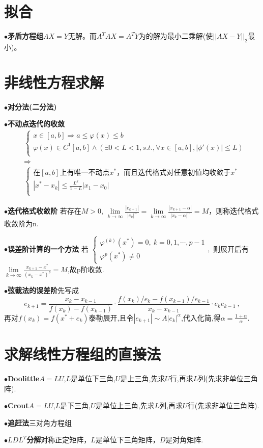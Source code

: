 \documentclass[UTF8]{article}
\newcommand{\keypoint}[2]{$\bullet$\textbf{#1}\quad#2\par}
\begin{document}
\section{拟合}
\keypoint{矛盾方程组}{$AX=Y$无解。而$A^TAX=A^TY$为的解为最小二乘解(使$||AX-Y||_2$最小)。}



\section{非线性方程求解}
\keypoint{对分法(二分法)}{}
\keypoint{不动点迭代的收敛}{
	\begin{align*}
	&\left\{ 
	\begin{array}{l}
	x\in[a,b] \Rightarrow a\leq\varphi(x)\leq b\\
	\varphi(x)\in C^1[a,b]\land (\exists 0<L<1,s.t.,\forall x\in[a,b], |\phi'(x)|\leq L)\\
	\end{array} 
	\right.
	\\
	&\Rightarrow
	\\
	&\left\{ 
	\begin{array}{l}
	\mbox{在$[a,b]$上有唯一不动点$x^*$，而且迭代格式对任意初值均收敛于$x^*$}\\
	|x^*-x_k|\leq\frac{L^k}{1-L}|x_1-x_0|\\
	\end{array} 
	\right.
	\end{align*}
	
}
\keypoint{迭代格式收敛阶}{
	若存在$M>0$, $\lim\limits_{k\rightarrow\infty}\frac{|e_{k+1}|}{|e_k|^n}=\lim\limits_{k\rightarrow\infty}\frac{|x_{k+1}-\alpha|}{|x_k-\alpha|^n}=M$，则称迭代格式收敛阶为n.
}
\keypoint{误差阶计算的一个方法}{
	若
	$\left\{
	\begin{array}{l}
	\varphi^{(k)}(x^*)=0,\ k=0,1,\cdots,p-1\\
	\varphi^p(x^*)\not=0
	\end{array}
	\right.,
	$
	则展开后有$\lim\limits_{k\rightarrow\infty}\frac{x_{k+1}-x^*}{(x_k-x^*)^p}=M$,故p阶收敛.
}
\keypoint{弦截法的误差阶}{先写成$$e_{k+1}=\frac{x_k-x_{k-1}}{f(x_k)-f(x_{k-1})}\cdot\frac{f(x_k)/e_k-f(x_{k-1})/e_{k-1}}{x_k-x_{k-1}}\cdot e_ke_{k-1}\ ,$$再对$f(x_k)=f(x^*+e_k)$泰勒展开,且令$|e_{k+1}|\sim A|e_k|^\alpha$,代入化简,得$\alpha=\frac{1+\alpha}{\alpha}.$}



\section{求解线性方程组的直接法}
\keypoint{Doolittle}{$A=LU$,$L$是单位下三角,$U$是上三角,先求$U$行,再求$L$列(先求非单位三角阵).}
\keypoint{Crout}{$A=LU$,$L$是下三角,$U$是单位上三角,先求$L$列,再求$U$行(先求非单位三角阵).}
\keypoint{追赶法}{三对角方程组}
\keypoint{$LDL^T$分解}{对称正定矩阵，$L$是单位下三角矩阵，$D$是对角矩阵.}
\end{document}
